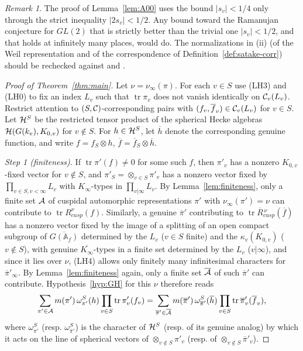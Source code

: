 \documentclass[12pt,letterpaper]{book}
\theoremstyle{plain}
\theoremstyle{definition}
\theoremstyle{remark}
\theoremstyle{remark}
\newtheorem{remyy}{Remark}
\newcommand{\tr}{\operatorname{tr}}
\begin{document}
\begin{remyy}\label{rem26:A00-norm}
The proof of Lemma~\ref{lem:A00} uses the bound $|s_v|<1/4$ only through
the strict inequality $|2s_v|<1/2$. Any bound toward the Ramanujan
conjecture for $GL(2)$ that is strictly better than the trivial one
$|s_v|<1/2$, and that holds at infinitely many places, would do. The
normalizations in (ii) (of the Weil representation and of the
correspondence of Definition~\ref{def:satake-corr}) should be rechecked
against \cite{Ge2} and \cite{GePS}.
\end{remyy}

\medskip

\begin{proof}[Proof of Theorem~\ref{thm:main}]
Let $\nu=\nu_\infty(\pi)$.
For each $v\in S$ use (LH3) and (LH0) to fix an index $L_v$ such that
$\tr \pi_v$ does not vanish identically on ${\cal C}_v(L_v)$.
Restrict attention to $(S,{\cal C})$-corresponding pairs with
$(f_v,\overline{f}_v)\in{\cal C}_v(L_v)$ for $v\in S$. Let ${\cal H}^S$ be
the restricted tensor product of the spherical Hecke algebras
${\cal H}(G(k_v),K_{0,v})$ for $v\notin S$. For $h\in{\cal H}^S$, let
$\overline{h}$ denote the corresponding genuine function, and write
$f=f_S\otimes h$, $\overline{f}=\overline{f}_S\otimes\overline{h}$.

{\em Step 1 (finiteness).} If $\tr \pi'(f)\neq 0$ for some such $f$,
then $\pi'_v$ has a nonzero $K_{0,v}$-fixed vector for $v\notin S$, and
$\pi'_S=\otimes_{v\in S}\pi'_v$ has a nonzero vector fixed by
$\prod_{v\in S, v<\infty}L_v$ with $K_\infty$-types in $\prod_{v|\infty}L_v$.
By Lemma~\ref{lem:finiteness}, only a finite set ${\cal A}$ of cuspidal
automorphic representations $\pi'$ with $\nu_\infty(\pi')=\nu$ can
contribute to $\tr R^\nu_{cusp}(f)$. Similarly, a genuine $\overline\pi'$
contributing to $\tr\overline R{}^{\,\nu}_{cusp}(\overline f)$ has a nonzero
vector fixed by the image of a splitting of an open compact subgroup of
$\overline{G({\mathbb A}_f)}$ determined by the $L_v$ ($v\in S$ finite) and
the $\kappa_v(K_{0,v})$ ($v\notin S$), with genuine $\overline{K_\infty}$-types
in a finite set determined by the $L_v$ ($v|\infty$), and since it lies
over $\nu$, (LH4) allows only finitely many infinitesimal characters for
$\overline\pi'_\infty$. By Lemma~\ref{lem:finiteness} again, only a finite
set $\overline{{\cal A}}$ of such $\overline\pi'$ can contribute.
Hypothesis~\ref{hyp:GH} for this $\nu$
therefore reads
\begin{equation}\label{eq:finite-identity}
\sum_{\pi'\in{\cal A}}m(\pi')\,\omega_{\pi'}^S(h)
\prod_{v\in S}\tr \pi'_v(f_v)
=\sum_{\overline{\pi}'\in\overline{{\cal A}}}m(\overline{\pi}')\,
\omega_{\overline{\pi}'}^S(\overline{h})
\prod_{v\in S}\tr \overline{\pi}'_v(\overline{f}_v),
\end{equation}
where $\omega_{\pi'}^S$ (resp. $\omega_{\overline{\pi}'}^S$) is the
character of ${\cal H}^S$ (resp. of its genuine analog) by which it acts
on the line of spherical vectors of $\otimes_{v\notin S}\pi'_v$ (resp. of
$\otimes_{v\notin S}\overline{\pi}'_v$).


\end{proof}
\end{document}
